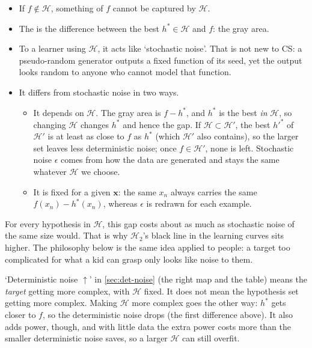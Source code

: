 \begin{itemize}
    \item If \(f \notin \mathcal{H}\), something of \(f\) cannot be captured by
        \(\mathcal{H}\).
    \item The  is the difference between the best
        \(h^* \in \mathcal{H}\) and \(f\): the gray area.
    \item To a learner using \(\mathcal{H}\), it acts like `stochastic noise'.
        That is not new to CS: a pseudo-random generator outputs a fixed
        function of its seed, yet the output looks random to anyone who
        cannot model that function.
    \item It differs from stochastic noise in two ways.
        \begin{itemize}
            \item It depends on \(\mathcal{H}\). The gray area is \(f -
                h^*\), and \(h^*\) is the best \emph{in} \(\mathcal{H}\), so
                changing \(\mathcal{H}\) changes \(h^*\) and hence the gap. If
                \(\mathcal{H} \subset \mathcal{H}'\), the best \(h'^*\) of
                \(\mathcal{H}'\) is at least as close to \(f\) as \(h^*\) (which
                \(\mathcal{H}'\) also contains), so the larger set leaves less
                deterministic noise; once \(f \in \mathcal{H}'\), none is left.
                Stochastic noise \(\epsilon\) comes from how the data are
                generated and stays the same whatever \(\mathcal{H}\) we
                choose.
            \item It is fixed for a given \(\bm{x}\): the same \(x_n\) always
                carries the same \(f(x_n) - h^*(x_n)\), whereas \(\epsilon\) is
                redrawn for each example.
        \end{itemize}
\end{itemize}
For every hypothesis in \(\mathcal{H}\), this gap costs about as much as
stochastic noise of the same size would. That is why \(\mathcal{H}_2\)'s black
line in the learning curves sits higher. The philosophy below is the same idea
applied to people: a target too complicated for what a kid can grasp only looks
like noise to them.

\begin{remark}
    `Deterministic noise \(\uparrow\)' in \autoref{sec:det-noise} (the right map
    and the table) means the \emph{target} getting more complex, with
    \(\mathcal{H}\) fixed. It does not mean the hypothesis set getting more
    complex. Making \(\mathcal{H}\) more complex goes the other way: \(h^*\)
    gets closer to \(f\), so the deterministic noise drops (the first
    difference above). It also adds power, though, and with little data the
    extra power costs more than the smaller deterministic noise saves, so a
    larger \(\mathcal{H}\) can still overfit.
\end{remark}

